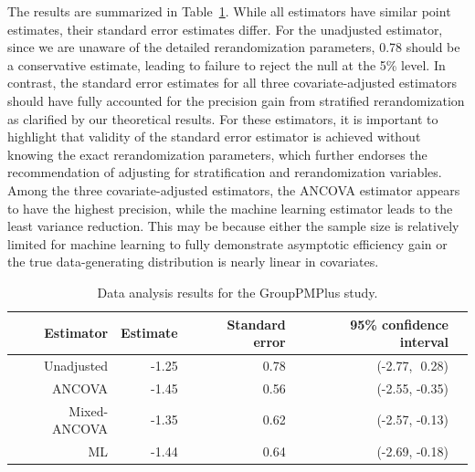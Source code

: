 \documentclass[12pt]{article}
\begin{document}
{The results are summarized in Table~\ref{tab:data1}. While all estimators have similar point estimates, their standard error estimates differ. For the unadjusted estimator, since we are unaware of the detailed rerandomization parameters, 0.78 should be a conservative estimate, leading to failure to reject the null at the 5\% level. In contrast, the standard error estimates for all three covariate-adjusted estimators should have fully accounted for the precision gain from stratified rerandomization as clarified by our theoretical results. For these estimators, it is important to highlight that validity of the standard error estimator is achieved without knowing the exact rerandomization parameters, which further endorses the recommendation of adjusting for stratification and rerandomization variables. Among the three covariate-adjusted estimators, the ANCOVA estimator appears to have the highest precision, while the machine learning estimator leads to the least variance reduction. This may be because either the sample size is relatively limited for machine learning to fully demonstrate asymptotic efficiency gain or the true data-generating distribution is nearly linear in covariates.

\begin{table}[ht]
    \centering
    \caption{Data analysis results for the GroupPMPlus study.}\label{tab:data1}
    \begin{tabular}{rrrrr}
  \hline
Estimator & Estimate & Standard error &  95\% confidence interval \\ 
  \hline
Unadjusted & -1.25 & 0.78 & (-2.77,\,\ 0.28) \\ 
  ANCOVA & -1.45 & 0.56 & (-2.55, -0.35) \\ 
  Mixed-ANCOVA & -1.35 & 0.62 & (-2.57, -0.13) \\ 
  ML & -1.44 & 0.64 & (-2.69, -0.18) \\ 
   \hline
\end{tabular}
\end{table}

}
\end{document}
